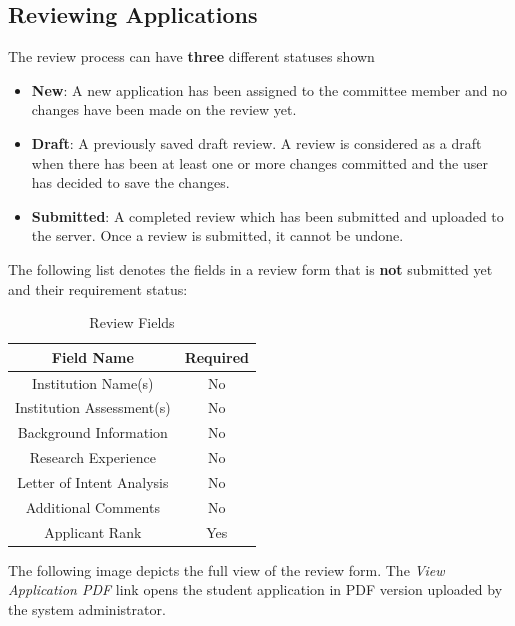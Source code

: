 \documentclass[fontsize=12pt,paper=letter,twoside]{scrartcl}
\begin{document}
\clearpage
\newpage
\subsection{Reviewing Applications} \label{sec:reviews}
The review process can have \textbf{three} different statuses shown
\begin{itemize}
\item \textbf{New}: A new application has been assigned to the committee member and no changes have been made on the review yet.
\item \textbf{Draft}: A previously saved draft review. A review is considered as a draft when there has been at least one or more changes committed and the user has decided to save the changes.
\item \textbf{Submitted}: A completed review which has been submitted and uploaded to the server. Once a review is submitted, it cannot be undone.
\end{itemize}

\bigskip
\noindent The following list denotes the fields in a review form that is \textbf{not} submitted yet and their requirement status:
\begin{table}[h]
\centering
\begin{tabular}{|c | c |}
	\cline{1-2}
	\textbf{Field Name} & \textbf{Required}\\ \hline
	Institution Name(s) & No \\ \hline
	Institution Assessment(s) & No \\ \hline
	Background Information & No \\ \hline
	Research Experience & No \\ \hline
	Letter of Intent Analysis & No \\ \hline
	Additional Comments & No \\ \hline
	Applicant Rank & Yes \\ \hline
\end{tabular}
\caption {Review Fields}
\label{tbl:cm:review_fields}
\end{table}

\newpage
\bigskip
\noindent The following image depicts the full view of the review form. The \emph{View Application PDF} link opens the student application in PDF version uploaded by the system administrator. 
\end{document}
